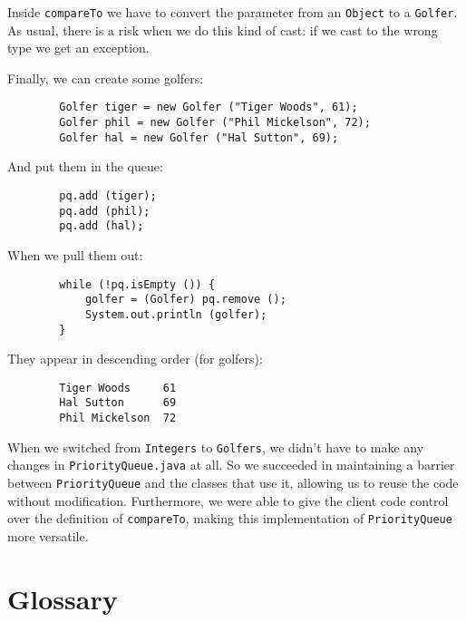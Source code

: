Inside {\tt compareTo} we have to convert the parameter from
an {\tt Object} to a {\tt Golfer}.  As usual, there is a risk
when we do this kind of cast: if we cast to the wrong type we
get an exception.

Finally, we can create some golfers:

\begin{verbatim}
        Golfer tiger = new Golfer ("Tiger Woods", 61);
        Golfer phil = new Golfer ("Phil Mickelson", 72);
        Golfer hal = new Golfer ("Hal Sutton", 69);
\end{verbatim}
%
And put them in the queue:

\begin{verbatim}
        pq.add (tiger);
        pq.add (phil);
        pq.add (hal);
\end{verbatim}
%
When we pull them out:

\begin{verbatim}
        while (!pq.isEmpty ()) {
            golfer = (Golfer) pq.remove ();
            System.out.println (golfer);
        }
\end{verbatim}
%
They appear in descending order (for golfers):

\begin{verbatim}
        Tiger Woods     61
        Hal Sutton      69
        Phil Mickelson  72
\end{verbatim}
%
When we switched from {\tt Integers} to {\tt Golfers}, we didn't
have to make any changes in {\tt PriorityQueue.java} at all.  So
we succeeded in maintaining a barrier between {\tt PriorityQueue}
and the classes that use it, allowing us to reuse the code without
modification.  Furthermore, we were able to give the client code
control over the definition of {\tt compareTo}, making this
implementation of {\tt PriorityQueue} more versatile.



\section{Glossary}

